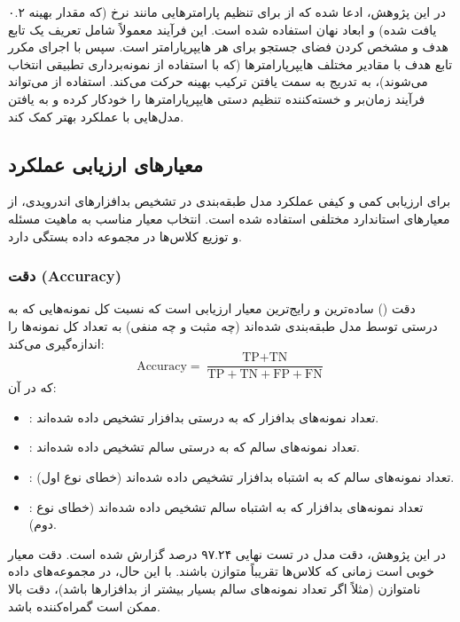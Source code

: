 در این پژوهش، ادعا شده که از  برای تنظیم پارامترهایی مانند نرخ  (که مقدار بهینه ۰.۲ یافت شده) و ابعاد نهان  استفاده شده است. این فرآیند معمولاً شامل تعریف یک تابع هدف  و مشخص کردن فضای جستجو برای هر هایپرپارامتر است. سپس  با اجرای مکرر تابع هدف با مقادیر مختلف هایپرپارامترها (که با استفاده از نمونه‌برداری تطبیقی انتخاب می‌شوند)، به تدریج به سمت یافتن ترکیب بهینه حرکت می‌کند. استفاده از  می‌تواند فرآیند زمان‌بر و خسته‌کننده تنظیم دستی هایپرپارامترها را خودکار کرده و به یافتن مدل‌هایی با عملکرد بهتر کمک کند.

\subsection{معیارهای ارزیابی عملکرد}
برای ارزیابی کمی و کیفی عملکرد مدل طبقه‌بندی  در تشخیص بدافزارهای اندرویدی، از معیارهای استاندارد مختلفی استفاده شده است. انتخاب معیار مناسب به ماهیت مسئله و توزیع کلاس‌ها در مجموعه داده بستگی دارد.

\subsubsection{دقت (Accuracy)}
دقت () ساده‌ترین و رایج‌ترین معیار ارزیابی است که نسبت کل نمونه‌هایی که به درستی توسط مدل طبقه‌بندی شده‌اند (چه مثبت و چه منفی) به تعداد کل نمونه‌ها را اندازه‌گیری می‌کند:
\[ \text{Accuracy} = \frac{\text{TP} + \text{TN}}{\text{TP} + \text{TN} + \text{FP} + \text{FN}} \]
که در آن:
\begin{itemize}
    \item {}: تعداد نمونه‌های بدافزار که به درستی بدافزار تشخیص داده شده‌اند.
    \item {}: تعداد نمونه‌های سالم که به درستی سالم تشخیص داده شده‌اند.
    \item {}: تعداد نمونه‌های سالم که به اشتباه بدافزار تشخیص داده شده‌اند (خطای نوع اول).
    \item {}: تعداد نمونه‌های بدافزار که به اشتباه سالم تشخیص داده شده‌اند (خطای نوع دوم).
\end{itemize}
در این پژوهش، دقت مدل  در تست نهایی ۹۷.۲۴ درصد گزارش شده است. دقت معیار خوبی است زمانی که کلاس‌ها تقریباً متوازن باشند. با این حال، در مجموعه‌های داده نامتوازن (مثلاً اگر تعداد نمونه‌های سالم بسیار بیشتر از بدافزارها باشد)، دقت بالا ممکن است گمراه‌کننده باشد.

